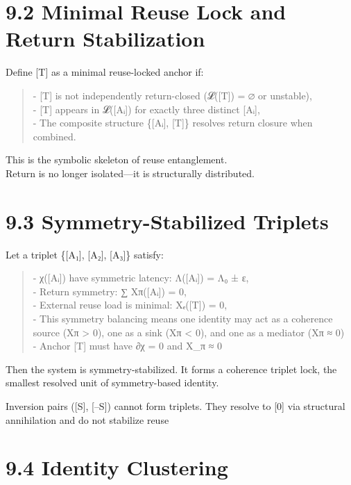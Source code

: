 \section{9.2 \textbar{} Minimal Reuse Lock and Return
Stabilization}\label{minimal-reuse-lock-and-return-stabilization}

Define {[}T{]} as a minimal reuse-locked anchor if:

\begin{quote}
- {[}T{]} is not independently return-closed (𝓛({[}T{]}) = ∅ or
unstable),\\
- {[}T{]} appears in 𝓛({[}Aᵢ{]}) for exactly three distinct {[}Aᵢ{]},\\
- The composite structure \{{[}Aᵢ{]}, {[}T{]}\} resolves return closure
when combined.
\end{quote}

This is the symbolic skeleton of reuse entanglement.\\
Return is no longer isolated---it is structurally distributed.

\section{9.3 \textbar{} Symmetry-Stabilized
Triplets}\label{symmetry-stabilized-triplets}

Let a triplet \{{[}A₁{]}, {[}A₂{]}, {[}A₃{]}\} satisfy:

\begin{quote}
- χ({[}Aᵢ{]}) have symmetric latency: Λ({[}Aᵢ{]}) = Λ₀ ± ε,\\
- Return symmetry: ∑ Xπ({[}Aᵢ{]}) = 0,\\
- External reuse load is minimal: Xₑ({[}T{]}) = 0,\\
- This symmetry balancing means one identity may act as a coherence
source (Xπ \textgreater{} 0), one as a sink (Xπ \textless{} 0), and one
as a mediator (Xπ ≈ 0)\\
- Anchor {[}T{]} must have ∂χ = 0 and X\_π ≈ 0
\end{quote}

Then the system is symmetry-stabilized. It forms a coherence triplet
lock, the smallest resolved unit of symmetry-based identity.

Inversion pairs ({[}S{]}, {[}--S{]}) cannot form triplets. They resolve
to {[}0{]} via structural annihilation and do not stabilize reuse

\section{9.4 \textbar{} Identity Clustering}\label{identity-clustering}

